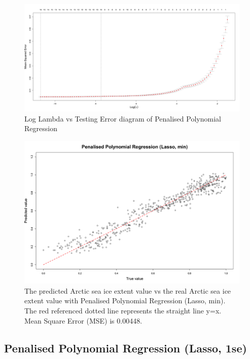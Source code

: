 \begin{figure}[htbp]
\centering
\includegraphics[width = 1.0\textwidth]{Figure/4.2.4-PPR-Log-Lambda-vs-Testing-Error.png}
\caption{Log Lambda vs Testing Error diagram of Penalised Polynomial Regression}
\label{4.2.4-PPR-Log-Lambda-vs-Testing-Error}
\end{figure}

\begin{figure}[htbp]
\centering
\includegraphics[width = 1.0\textwidth]{Figure/4.2.4-PPR-min.png}
\caption{The predicted Arctic sea ice extent value vs the real Arctic sea ice extent value with Penalised Polynomial Regression (Lasso, min). The red referenced dotted line represents the straight line y=x. Mean Square Error (MSE) is 0.00448.}
\label{4.2.4-PPR-min}
\end{figure}



\subsection{Penalised Polynomial Regression (Lasso, 1se)} %

